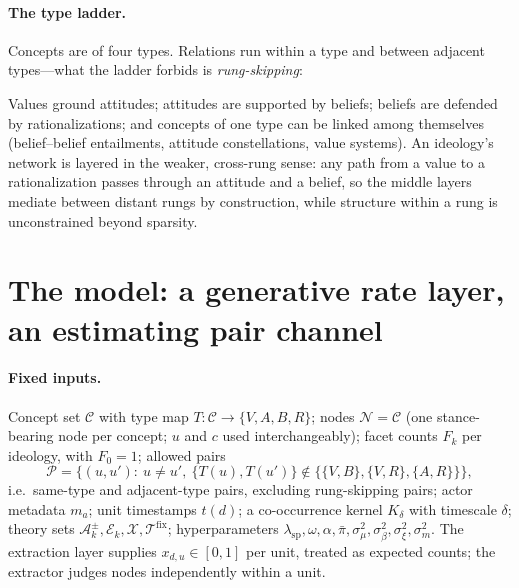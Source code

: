 \documentclass[11pt]{article}
\newcommand{\CC}{\mathcal{C}}
\newcommand{\NN}{\mathcal{N}}
\newcommand{\PP}{\mathcal{P}}
\newcommand{\Xcal}{\mathcal{X}}
\newcommand{\Acal}{\mathcal{A}}
\newcommand{\Ecal}{\mathcal{E}}
\newcommand{\Tcal}{\mathcal{T}}
\newcommand{\1}{\mathbb{1}}
\newcommand{\node}[2]{\textsf{#1\,:\,#2}}
\begin{document}
\paragraph{The type ladder.} Concepts are of four types. Relations run within a type and between adjacent types---what the ladder forbids is \emph{rung-skipping}:
\begin{center}
\end{center}
Values ground attitudes; attitudes are supported by beliefs; beliefs are defended by rationalizations; and concepts of one type can be linked among themselves (belief--belief entailments, attitude constellations, value systems). An ideology's network is layered in the weaker, cross-rung sense: any path from a value to a rationalization passes through an attitude and a belief, so the middle layers mediate between distant rungs by construction, while structure within a rung is unconstrained beyond sparsity.

\section{The model: a generative rate layer, an estimating pair channel}\label{sec:generative}

\paragraph{Fixed inputs.} Concept set $\CC$ with type map $T:\CC\to\{V,A,B,R\}$; nodes $\NN=\CC$ (one stance-bearing node per concept; $u$ and $c$ used interchangeably); facet counts $F_k$ per ideology, with $F_0=1$; allowed pairs
\[
  \PP=\big\{(u,u'):\ u\ne u',\ \{T(u),T(u')\}\notin\big\{\{V,B\},\{V,R\},\{A,R\}\big\}\big\},
\]
i.e.\ same-type and adjacent-type pairs, excluding rung-skipping pairs; actor metadata $m_a$; unit timestamps $t(d)$; a co-occurrence kernel $K_\delta$ with timescale $\delta$; theory sets $\Acal^\pm_k,\Ecal_k,\Xcal,\Tcal^{\text{fix}}$; hyperparameters $\lambda_{\text{sp}},\omega,\alpha,\bar\pi,\sigma_\mu^2,\sigma_\beta^2,\sigma_\xi^2,\sigma_m^2$. The extraction layer supplies $x_{d,u}\in[0,1]$ per unit, treated as expected counts; the extractor judges nodes independently within a unit.
\end{document}
